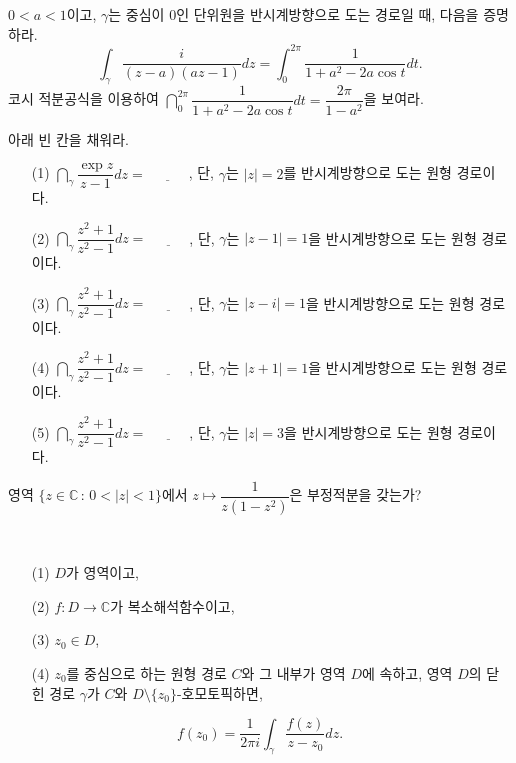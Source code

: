 \newpage %

\begin{salt_exercise} \label{ex-3-24}
$0<a<1$이고, $\gamma$는 중심이 $0$인 단위원을 반시계방향으로 도는 경로일 때,
다음을 증명하라.
\[
\int_\gamma \dfrac{i}{(z-a)(az-1)}dz = \int_0^{2\pi} \dfrac 1{1+a^2-2a\cos t}dt.
\]
코시 적분공식을 이용하여 
$\dint_0^{2\pi} \dfrac 1{1+a^2-2a\cos t}dt = \dfrac{2\pi}{1-a^2}$을 보여라.
\end{salt_exercise}

\begin{salt_exercise} \label{ex-3-25}
아래 빈 칸을 채워라.
\begin{itemize}
\item[(1)] $\dint_\gamma \dfrac{\exp z}{z-1}dz = \underline{\quad\quad\quad}$,
단, $\gamma$는 $|z|=2$를 반시계방향으로 도는 원형 경로이다.
\item[(2)] $\dint_\gamma \dfrac{z^2+1}{z^2-1}dz = \underline{\quad\quad\quad}$,
단, $\gamma$는 $|z-1|=1$을 반시계방향으로 도는 원형 경로이다.
\item[(3)] $\dint_\gamma \dfrac{z^2+1}{z^2-1}dz = \underline{\quad\quad\quad}$,
단, $\gamma$는 $|z-i|=1$을 반시계방향으로 도는 원형 경로이다.
\item[(4)] $\dint_\gamma \dfrac{z^2+1}{z^2-1}dz = \underline{\quad\quad\quad}$,
단, $\gamma$는 $|z+1|=1$을 반시계방향으로 도는 원형 경로이다.
\item[(5)] $\dint_\gamma \dfrac{z^2+1}{z^2-1}dz = \underline{\quad\quad\quad}$,
단, $\gamma$는 $|z|=3$을 반시계방향으로 도는 원형 경로이다.
\end{itemize}
\end{salt_exercise}

\begin{salt_exercise} \label{ex-3-26}
영역 $\{ z\in \mathbb C\,:\, 0<|z|<1\}$에서
 $z\mapsto \dfrac1{z(1-z^2)}$은 부정적분을 갖는가?
\end{salt_exercise}

\begin{salt_corollary}  \label{coro-3-5}
\
\begin{itemize}
\item[(1)] $D$가 영역이고, 
\item[(2)] $f:D\to\mathbb C$가 복소해석함수이고,
\item[(3)] $z_0\in D$, 
\item[(4)] $z_0$를 중심으로 하는 원형 경로 $C$와 그 내부가 영역 $D$에 속하고,
영역 $D$의 닫힌 경로 $\gamma$가 $C$와 $D\setminus \{z_0\}$-호모토픽하면,
\end{itemize}
\[
f(z_0) = \dfrac1{2\pi i}\int_\gamma \dfrac{f(z)}{z-z_0}dz.
\]
\end{salt_corollary}

